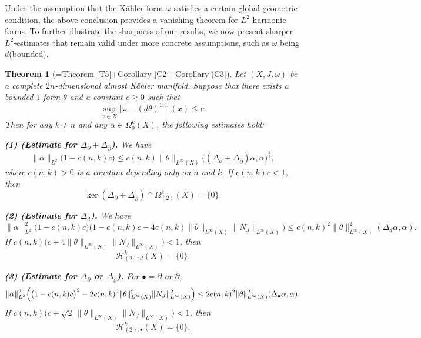 \documentclass[12pt, twoside]{article}
\newtheorem{theorem}{Theorem}[section]
\theoremstyle{definition}
\numberwithin{equation}{section}
\def\w {\omega}
\begin{document}
	Under the assumption that the Kähler form $\w$ satisfies a certain global geometric condition, the above conclusion provides a vanishing theorem for $L^{2}$-harmonic forms. To further illustrate the sharpness of our results, we now present sharper $L^{2}$-estimates that remain valid under more concrete assumptions, such as $\w$ being $d$(bounded).
	
	


	\begin{theorem}[=Theorem \ref{T5}+Corollary \ref{C2}+Corollary \ref{C3}]\label{T11}
Let $(X,J,\omega)$ be a complete $2n$-dimensional almost K\"ahler manifold. 
Suppose that there exists a bounded $1$-form $\theta$ and a constant $c\ge 0$ such that
\[
\sup_{x\in X}\bigl|\omega-(d\theta)^{1,1}\bigr|(x)\le c.
\]
Then for any $k\neq n$ and any $\alpha\in\Omega_0^k(X)$, the following estimates hold:

\noindent\textbf{(1) (Estimate for $\Delta_\partial+\Delta_{\bar\partial}$).}
We have
\[
\|\alpha\|_{L^2}\bigl(1-c(n,k)c\bigr)\le c(n,k)\|\theta\|_{L^\infty(X)}\bigl((\Delta_\partial+\Delta_{\bar\partial})\alpha,\alpha\bigr)^{\frac12},
\]
where $c(n,k)>0$ is a constant depending only on $n$ and $k$. 
If $c(n,k)c<1$, then
\[
\ker(\Delta_\partial+\Delta_{\bar\partial})\cap\Omega_{(2)}^k(X)=\{0\}.
\]

\noindent\textbf{(2) (Estimate for $\Delta_d$).}
We have
\[
\|\alpha\|_{L^2}^2\bigl(1-c(n,k)c\bigr)\bigl(1-c(n,k)c-4c(n,k)\|\theta\|_{L^\infty(X)}\|N_J\|_{L^\infty(X)}\bigr)
\le c(n,k)^2\|\theta\|_{L^\infty(X)}^2(\Delta_d\alpha,\alpha).
\]
If $c(n,k)\bigl(c+4\|\theta\|_{L^\infty(X)}\|N_J\|_{L^\infty(X)}\bigr)<1$, then
\[
\mathcal{H}_{(2);d}^k(X)=\{0\}.
\]

\noindent\textbf{(3) (Estimate for $\Delta_\partial$ or $\Delta_{\bar\partial}$).}
For $\bullet=\partial$ or $\bar\partial$,
\[
\|\alpha\|_{L^2}^2\Bigl(\bigl(1-c(n,k)c\bigr)^2-2c(n,k)^2\|\theta\|_{L^\infty(X)}^2\|N_J\|_{L^\infty(X)}^2\Bigr)
\le 2c(n,k)^2\|\theta\|_{L^\infty(X)}^2(\Delta_\bullet\alpha,\alpha).
\]
If $c(n,k)\bigl(c+\sqrt2\,\|\theta\|_{L^\infty(X)}\|N_J\|_{L^\infty(X)}\bigr)<1$, then
\[
\mathcal{H}_{(2);\bullet}^k(X)=\{0\}.
\]
\end{theorem}
	
\end{document}
